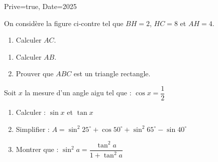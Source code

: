 \documentclass[a4paper,12pt]{article}
\begin{document}
\begin{Maquette}[Exam]{Prive=true, Date=2025}
\begin{exercice}[BaremeDetaille]
On considère la figure ci-contre tel que $BH=2$, $HC=8$ et $AH=4$.
\vspace*{3mm}

\begin{minipage}{.7\linewidth}
\begin{enumerate}
\item{} Calculer $AC$.\newline\anserline[5]
\end{enumerate}
\end{minipage}%
\begin{minipage}{.3\linewidth}
\end{minipage}%
\begin{enumerate}[start=2]
\item{} Calculer $AB$.\newline\anserline[5]
\item{} Prouver que $ABC$ est un triangle rectangle.\newline\anserline[6]
\end{enumerate}
\end{exercice}

\begin{exercice}[BaremeDetaille]
Soit $x$ la mesure d'un angle aigu tel que : $\cos x =\dfrac{1}{2}$
\begin{enumerate}
\item{} Calculer : $\sin x$ et $\tan x$\vspace{5mm}

\begin{minipage}{0.48\linewidth}
\anserline[6]
\end{minipage}\hfill\vrule\hfill%
\begin{minipage}{0.48\linewidth}
\anserline[6]
\end{minipage}
\item{} Simplifier  :
$A = \sin^{2}25^{\circ} +\cos50^{\circ} +\sin^{2}65^{\circ}-\sin40^{\circ}$\newline\anserline[7]
\item{} Montrer que : $\sin^{2}a = \dfrac{\tan^{2}a}{1+\tan^{2}a}$


\end{enumerate}
\end{exercice}
\end{Maquette}
\end{document}
